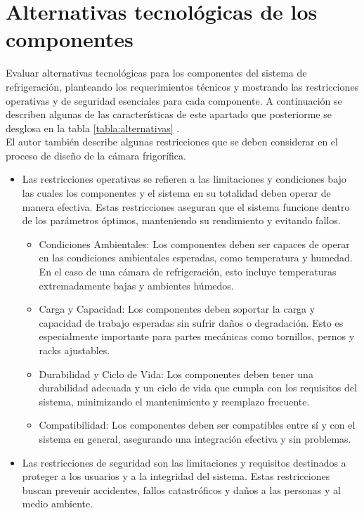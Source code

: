 \section{Alternativas tecnológicas de los componentes}
Evaluar alternativas tecnológicas para los componentes del sistema de refrigeración, planteando los requerimientos técnicos y mostrando las restricciones operativas y de seguridad esenciales para cada componente. A continuación se describen algunas de las características de este apartado que posteriorme se desglosa en la tabla \ref{tabla:alternativas} \cite{salvatore-2015}. \\
El autor también describe algunas restricciones que se deben considerar en el proceso de diseño de la cámara frigorífica.
\begin{itemize}
	\item Las restricciones operativas se refieren a las limitaciones y condiciones bajo las cuales los componentes y el sistema en su totalidad deben operar de manera efectiva. Estas restricciones aseguran que el sistema funcione dentro de los parámetros óptimos, manteniendo su rendimiento y evitando fallos.
	
	\begin{itemize}
		\item {Condiciones Ambientales:} Los componentes deben ser capaces de operar en las condiciones ambientales esperadas, como temperatura y humedad. En el caso de una cámara de refrigeración, esto incluye temperaturas extremadamente bajas y ambientes húmedos.
		\item {Carga y Capacidad:} Los componentes deben soportar la carga y capacidad de trabajo esperadas sin sufrir daños o degradación. Esto es especialmente importante para partes mecánicas como tornillos, pernos y racks ajustables.
		\item {Durabilidad y Ciclo de Vida:} Los componentes deben tener una durabilidad adecuada y un ciclo de vida que cumpla con los requisitos del sistema, minimizando el mantenimiento y reemplazo frecuente.
		\item {Compatibilidad:} Los componentes deben ser compatibles entre sí y con el sistema en general, asegurando una integración efectiva y sin problemas.
	\end{itemize}
	
	
	
	\item Las restricciones de seguridad son las limitaciones y requisitos destinados a proteger a los usuarios y a la integridad del sistema. Estas restricciones buscan prevenir accidentes, fallos catastróficos y daños a las personas y al medio ambiente.
	

\end{itemize}
